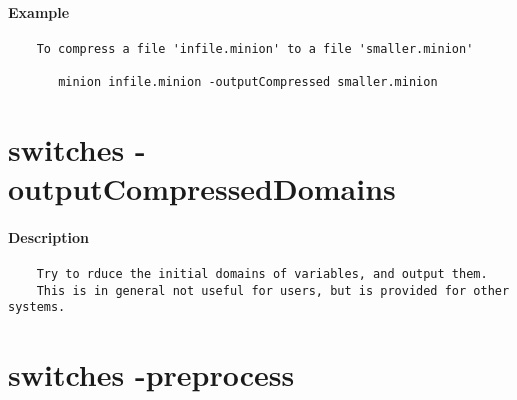 \paragraph{Example}
{\footnotesize
\begin{verbatim}
    To compress a file 'infile.minion' to a file 'smaller.minion'

       minion infile.minion -outputCompressed smaller.minion
\end{verbatim}
}
\section{switches -outputCompressedDomains}
\paragraph{Description}
{\footnotesize
\begin{verbatim}
    Try to rduce the initial domains of variables, and output them.
    This is in general not useful for users, but is provided for other systems.
\end{verbatim}
}
\section{switches -preprocess}

